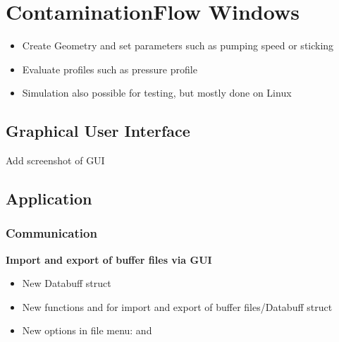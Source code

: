 
\chapter{ContaminationFlow Windows}\label{chapter:Windows}

\begin{itemize}[noitemsep,topsep=0pt]
\item Create Geometry and set parameters such as pumping speed or sticking
\item Evaluate profiles such as pressure profile
\item Simulation also possible for testing, but mostly done on Linux
\end{itemize}

\section{Graphical User Interface}
Add screenshot of GUI

\section{Application}
\subsection{Communication}
\textbf{Import and export of buffer files via GUI}
\begin{itemize}[noitemsep,topsep=0pt]
\item New Databuff struct 
\item New functions  and  for import and export of buffer files/Databuff struct
\item New options in file menu:  and 
\end{itemize}

